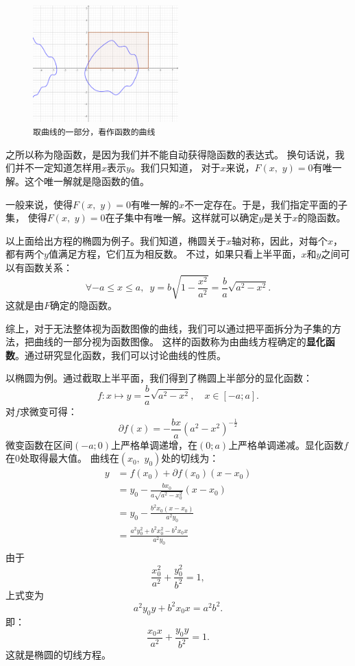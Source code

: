 \documentclass[12pt,UTF8]{ctexbook}
\begin{document}
\begin{figure} %
    \vspace{-30pt}
    \flushright
    \includegraphics[width=0.5\textwidth]{tu/复杂平面曲线.png}
    \caption*{\texttt{取曲线的一部分，看作函数的曲线}}
\end{figure}

之所以称为隐函数，是因为我们并不能自动获得隐函数的表达式。
换句话说，我们并不一定知道怎样用$x$表示$y$。我们只知道，
对于$x$来说，$F(x, \,\,y) = 0$有唯一解。这个唯一解就是隐函数的值。

一般来说，使得$F(x, \,\,y) = 0$有唯一解的$x$不一定存在。于是，我们指定平面的子集，
使得$F(x, \,\,y) = 0$在子集中有唯一解。这样就可以确定$y$是关于$x$的隐函数。

以上面给出方程的椭圆为例子。我们知道，椭圆关于$x$轴对称，因此，对每个$x$，都有两个$y$值满足方程，它们互为相反数。
不过，如果只看上半平面，$x$和$y$之间可以有函数关系：
$$ \forall -a\leqslant x \leqslant a, \,\,\, y = b\sqrt{1 - \frac{x^2}{a^2}}= \frac{b}{a}\sqrt{a^2 - x^2}. $$
这就是由$F$确定的隐函数。

综上，对于无法整体视为函数图像的曲线，我们可以通过把平面拆分为子集的方法，把曲线的一部分视为函数图像。
这样的函数称为由曲线方程确定的\textbf{显化函数}。通过研究显化函数，我们可以讨论曲线的性质。

以椭圆为例。通过截取上半平面，我们得到了椭圆上半部分的显化函数：
$$ f: x\mapsto y = \frac{b}{a}\sqrt{a^2 - x^2}, \quad x \in [-a; a].  $$
对$f$求微变可得：
$$ \partial f(x) = -\frac{bx}{a}(a^2 - x^2)^{-\frac{1}{2}}$$
微变函数在区间$(-a;0)$上严格单调递增，在$(0;a)$上严格单调递减。显化函数$f$在$0$处取得最大值。
曲线在$(x_0,\,\, y_0)$处的切线为：
\begin{align*}
    y &= f(x_0) + \partial f(x_0)(x - x_0) \\
    &= y_0 -\frac{bx_0}{a\sqrt{a^2 - x_0^2}}(x - x_0) \\
    &= y_0 - \frac{b^2x_0(x - x_0)}{a^2y_0} \\
    &= \frac{a^2y_0^2 + b^2x_0^2 - b^2x_0x}{a^2y_0} \\
\end{align*}
由于
$$ \frac{x_0^2}{a^2} + \frac{y_0^2}{b^2} = 1,$$
上式变为
$$ a^2y_0y +  b^2x_0x = a^2b^2. $$
即：
$$ \frac{x_0x}{a^2} + \frac{y_0y}{b^2} = 1.$$
这就是椭圆的切线方程。
\end{document}
